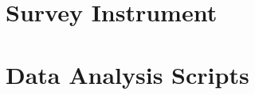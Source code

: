 \documentclass[11pt, a4paper]{article}\usepackage[]{graphicx}\usepackage[]{color}
\begin{document}

\section{Survey Instrument}

\section{Data Analysis Scripts} \label{sec:rscripts}
\end{document}
